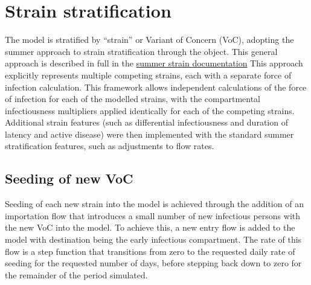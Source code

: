 \section{Strain stratification} \label{strain}
The model is stratified by ``strain'' or Variant of Concern (VoC),
adopting the summer approach to strain stratification 
through the  object.
This general approach is described in full in the 
\href{http://summerepi.com/examples/8-strain-stratification.html}{summer strain documentation} 
This approach explicitly represents multiple competing strains,
each with a separate force of infection calculation.
This framework allows independent calculations of 
the force of infection for each of the modelled strains,
with the compartmental infectiousness multipliers applied identically 
for each of the competing strains.
Additional strain features 
(such as differential infectiousness and duration of latency and active disease)
were then implemented with the standard summer stratification features,
such as adjustments to flow rates.

\subsection{Seeding of new VoC}
Seeding of each new strain into the model 
is achieved through the addition of an importation flow
that introduces a small number of new infectious persons with the new VoC into the model.
To achieve this, 
a new entry flow is added to the model 
with destination being the early infectious compartment.
The rate of this flow is a step function that transitions from zero 
to the requested daily rate of seeding for the requested number of days,
before stepping back down to zero for the remainder of the period simulated.

